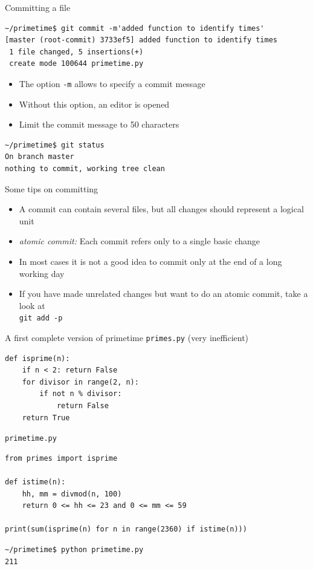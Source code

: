 \documentclass[svgnames]{beamer}
\begin{document}
\begin{frame}[fragile]{Committing a file}
 \begin{lstlisting}
~/primetime$ git commit -m'added function to identify times'
[master (root-commit) 3733ef5] added function to identify times
 1 file changed, 5 insertions(+)
 create mode 100644 primetime.py
 \end{lstlisting}
 \begin{itemize}
  \item The option \texttt{-m} allows to specify a commit message
  \item Without this option, an editor is opened
  \item Limit the commit message to 50 characters
 \end{itemize}

 \vspace{0.2truecm}
 \begin{lstlisting}
~/primetime$ git status
On branch master
nothing to commit, working tree clean
 \end{lstlisting}
\end{frame}

\begin{frame}{Some tips on committing}
 \begin{itemize}
  \item A commit can contain several files, but all changes should
	represent a logical unit
  \item \textit{atomic commit:} Each commit refers only to a single
	basic change
  \item In most cases it is not a good idea to commit only at the
	end of a long working day
  \item If you have made unrelated changes but want to do an atomic
	commit, take a look at\\ \texttt{git add -p}
 \end{itemize}
\end{frame}

\begin{frame}[fragile]{A first complete version of primetime}
 \texttt{primes.py} (very inefficient)
 \begin{lstlisting}
def isprime(n):
    if n < 2: return False
    for divisor in range(2, n):
        if not n % divisor:
            return False
    return True
 \end{lstlisting}

 \vspace{0.2truecm}
 \texttt{primetime.py}
 \begin{lstlisting}
from primes import isprime

def istime(n):
    hh, mm = divmod(n, 100)
    return 0 <= hh <= 23 and 0 <= mm <= 59

print(sum(isprime(n) for n in range(2360) if istime(n)))
 \end{lstlisting}

 \vspace{0.4truecm}
 \begin{lstlisting}
~/primetime$ python primetime.py
211 
 \end{lstlisting}
\end{frame}
\end{document}
